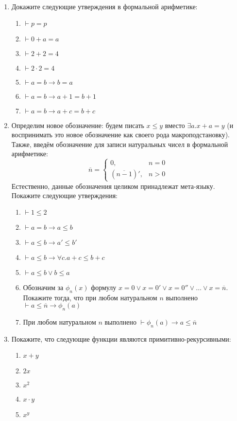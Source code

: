 \documentclass[10pt,a4paper,oneside]{article}
\begin{document}
\begin{enumerate}
\item Докажите следующие утверждения в формальной арифметике:

\begin{enumerate}
\item $\vdash p = p$
\item $\vdash 0 + a = a$
\item $\vdash 2 + 2 = 4$
\item $\vdash 2 \cdot 2 = 4$
\item $\vdash a = b \rightarrow b = a$
\item $\vdash a = b \rightarrow a + 1 = b + 1$
\item $\vdash a = b \rightarrow a + c = b + c$
\end{enumerate}

\item Определим новое обозначение: будем писать $x \le y$ вместо $\exists a.x + a = y$
(и воспринимать это новое обозначение как своего рода макроподстановку).
Также, введём обозначение для записи натуральных чисел в формальной арифметике:
$$\overline{n} = \left\{\begin{array}{ll}0,& n=0 \\ (\overline{n-1})',& n > 0\end{array}\right.$$
Естественно, данные обозначения целиком принадлежат мета-языку.
Покажите следующие утверждения:

\begin{enumerate}
\item $\vdash 1 \le 2$
\item $\vdash a = b \rightarrow a \le b$
\item $\vdash a \le b \rightarrow a' \le b'$
\item $\vdash a \le b \rightarrow \forall c.a + c \le b + c$
\item $\vdash a \le b \vee b \le a$
\item Обозначим за $\phi_n(x)$ формулу $x = 0 \vee x = 0' \vee x = 0'' \vee \dots \vee x = \overline{n}$.
Покажите тогда, что при любом натуральном $n$ выполнено $\vdash a \le \overline{n} \rightarrow \phi_n(a)$
\item При любом натуральном $n$ выполнено $\vdash \phi_n(a) \rightarrow a \le \overline{n}$
\end{enumerate}

\item Покажите, что следующие функции являются примитивно-рекурсивными:
\begin{enumerate}
\item $x + y$
\item $2x$
\item $x^2$
\item $x \cdot y$
\item $x^y$
\end{enumerate}


\end{enumerate}
\end{document}
